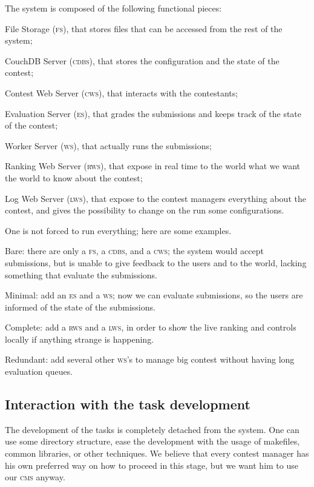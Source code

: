 \documentclass[a4paper,8pt]{amsart}
\newcommand{\CMS}{\textsc{cms}}
\newcommand{\FS}{\textsc{fs}}
\newcommand{\CDBS}{\textsc{cdbs}}
\newcommand{\CWS}{\textsc{cws}}
\newcommand{\ES}{\textsc{es}}
\newcommand{\WS}{\textsc{ws}}
\newcommand{\LWS}{\textsc{lws}}
\newcommand{\RWS}{\textsc{rws}}
\newenvironment{squishlist}{%
  \begin{list}{\textbullet}%
    { \setlength{\itemsep}{0pt}%
      \setlength{\parsep}{3pt}%
      \setlength{\topsep}{3pt}%
      \setlength{\partopsep}{0pt}%
      \setlength{\leftmargin}{1.5em}%
      \setlength{\labelwidth}{1em}%
      \setlength{\labelsep}{0.5em} }%
}{\end{list}}
\begin{document}
\begin{multicols}{2}
  The system is composed of the following functional pieces:
  \begin{squishlist}
  \item File Storage (\FS{}), that stores files that can be accessed from
    the rest of the system;
  \item CouchDB Server (\CDBS{}), that stores the configuration and the
    state of the contest;
  \item Contest Web Server (\CWS{}), that interacts with the contestants;
  \item Evaluation Server (\ES{}), that grades the submissions and keeps
    track of the state of the contest;
  \item Worker Server (\WS{}), that actually runs the submissions;
  \item Ranking Web Server (\RWS{}), that expose in real time to the
    world what we want the world to know about the contest;
  \item Log Web Server (\LWS{}), that expose to the contest managers
    everything about the contest, and gives the possibility to change
    on the run some configurations.
  \end{squishlist}

  One is not forced to run everything; here are some examples.
  \begin{squishlist}
  \item Bare: there are only a \FS{}, a \CDBS{}, and a \CWS{}; the
    system would accept submissions, but is unable to give feedback to
    the users and to the world, lacking something that evaluate the
    submissions.
  \item Minimal: add an \ES{} and a \WS{}; now we can evaluate
    submissions, so the users are informed of the state of the
    submissions.
  \item Complete: add a \RWS{} and a \LWS{}, in order to show the live
    ranking and controls locally if anything strange is happening.
  \item Redundant: add several other \WS{}'s to manage big contest
    without having long evaluation queues.
  \end{squishlist}

  \subsection{Interaction with the task development}

  The development of the tasks is completely detached from the
  system. One can use some directory structure, ease the development
  with the usage of makefiles, common libraries, or other
  techniques. We believe that every contest manager has his own
  preferred way on how to proceed in this stage, but we want him to
  use our \CMS{} anyway.


\end{multicols}
\end{document}
